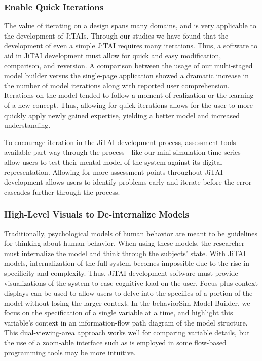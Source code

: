 \documentclass{sigchi}
\begin{document}
\subsubsection{Enable Quick Iterations}
The value of iterating on a design spans many domains, and is very applicable to the development of JiTAIs. 
Through our studies we have found that the development of even a simple JiTAI requires many iterations.
Thus, a software to aid in JiTAI development must allow for quick and easy modification, comparison, and reversion.
A comparison between the usage of our multi-staged model builder versus the single-page application showed a dramatic increase in the number of model iterations along with reported user comprehension.
Iterations on the model tended to follow a moment of realization or the learning of a new concept.
Thus, allowing for quick iterations allows for the user to more quickly apply newly gained expertise, yielding a better model and increased understanding.

To encourage iteration in the JiTAI development process, assessment tools available part-way through the process - like our mini-simulation time-series - allow users to test their mental model of the system against its digital representation.
Allowing for more assessment points throughout JiTAI development allows users to identify problems early and iterate before the error cascades further through the process.

\subsubsection{High-Level Visuals to De-internalize Models}
Traditionally, psychological models of human behavior are meant to be guidelines for thinking about human behavior.
When using these models, the researcher must internalize the model and think through the subjects' state.
With JiTAI models, internalization of the full system becomes impossible due to the rise in specificity and complexity.
Thus, JiTAI development software must provide visualizations of the system to ease cognitive load on the user.
Focus plus context displays \cite{baudisch2001focus} can be used to allow users to delve into the specifics of a portion of the model without losing the larger context. 
In the behaviorSim Model Builder, we focus on the specification of a single variable at a time, and highlight this variable’s context in an information-flow path diagram of the model structure.
This dual-viewing-area approach works well for comparing variable details, but the use of a zoom-able interface such as is employed in some flow-based programming \cite{morrison2010flow} tools may be more intuitive.
\end{document}
